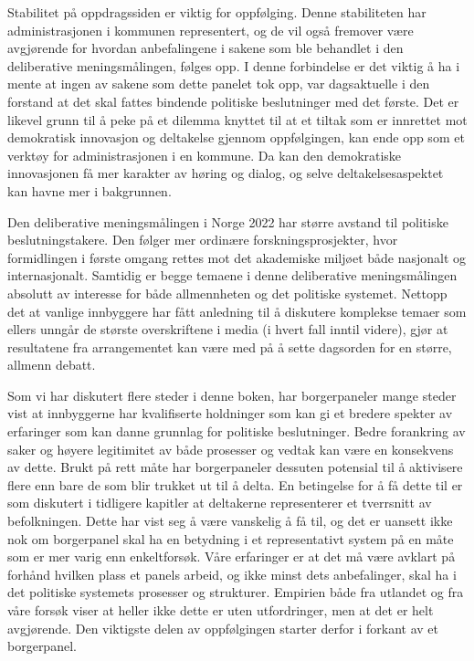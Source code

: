 \documentclass[
  12pt,
  a4paper, 12pt]{article}
\begin{document}
Stabilitet på oppdragssiden er viktig for oppfølging. Denne stabiliteten har administrasjonen i kommunen representert, og de vil også fremover være avgjørende for hvordan anbefalingene i sakene som ble behandlet i den deliberative meningsmålingen, følges opp. I denne forbindelse er det viktig å ha i mente at ingen av sakene som dette panelet tok opp, var dagsaktuelle i den forstand at det skal fattes bindende politiske beslutninger med det første. Det er likevel grunn til å peke på et dilemma knyttet til at et tiltak som er innrettet mot demokratisk innovasjon og deltakelse gjennom oppfølgingen, kan ende opp som et verktøy for administrasjonen i en kommune. Da kan den demokratiske innovasjonen få mer karakter av høring og dialog, og selve deltakelsesaspektet kan havne mer i bakgrunnen.

Den deliberative meningsmålingen i Norge 2022 har større avstand til politiske beslutningstakere. Den følger mer ordinære forskningsprosjekter, hvor formidlingen i første omgang rettes mot det akademiske miljøet både nasjonalt og internasjonalt. Samtidig er begge temaene i denne deliberative meningsmålingen absolutt av interesse for både allmennheten og det politiske systemet. Nettopp det at vanlige innbyggere har fått anledning til å diskutere komplekse temaer som ellers unngår de største overskriftene i media (i hvert fall inntil videre), gjør at resultatene fra arrangementet kan være med på å sette dagsorden for en større, allmenn debatt.

Som vi har diskutert flere steder i denne boken, har borgerpaneler mange steder vist at innbyggerne har kvalifiserte holdninger som kan gi et bredere spekter av erfaringer som kan danne grunnlag for politiske beslutninger. Bedre forankring av saker og høyere legitimitet av både prosesser og vedtak kan være en konsekvens av dette. Brukt på rett måte har borgerpaneler dessuten potensial til å aktivisere flere enn bare de som blir trukket ut til å delta. En betingelse for å få dette til er som diskutert i tidligere kapitler at deltakerne representerer et tverrsnitt av befolkningen. Dette har vist seg å være vanskelig å få til, og det er uansett ikke nok om borgerpanel skal ha en betydning i et representativt system på en måte som er mer varig enn enkeltforsøk. Våre erfaringer er at det må være avklart på forhånd hvilken plass et panels arbeid, og ikke minst dets anbefalinger, skal ha i det politiske systemets prosesser og strukturer. Empirien både fra utlandet og fra våre forsøk viser at heller ikke dette er uten utfordringer, men at det er helt avgjørende. Den viktigste delen av oppfølgingen starter derfor i forkant av et borgerpanel.
\end{document}
